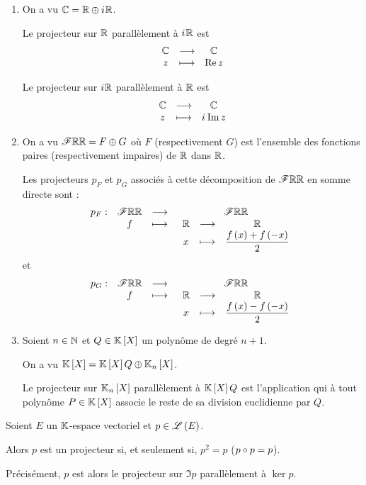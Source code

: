 \begin{ex}
\begin{enumerate}
\item On a vu \(\C=\R\oplus\i\R\).

Le projecteur sur \(\R\) parallèlement à \(\i\R\) est \[\fonctionlambda{\C}{\C}{z}{\Re z}\]

Le projecteur sur \(\i\R\) parallèlement à \(\R\) est \[\fonctionlambda{\C}{\C}{z}{\i\Im z}\]

\item On a vu \(\F{\R}{\R}=F\oplus G\) où \(F\) (respectivement \(G\)) est l'ensemble des fonctions paires (respectivement impaires) de \(\R\) dans \(\R\).

Les projecteurs \(p_F\) et \(p_G\) associés à cette décomposition de \(\F{\R}{\R}\) en somme directe sont : \[\fonction{p_F}{\F{\R}{\R}}{\F{\R}{\R}}{f}{\fonctionlambda{\R}{\R}{x}{\dfrac{f\paren{x}+f\paren{-x}}{2}}}\] et \[\fonction{p_G}{\F{\R}{\R}}{\F{\R}{\R}}{f}{\fonctionlambda{\R}{\R}{x}{\dfrac{f\paren{x}-f\paren{-x}}{2}}}\]

\item Soient \(n\in\N\) et \(Q\in\poly\) un polynôme de degré \(n+1\).

On a vu \(\poly=\poly Q\oplus\polydeg{n}\).

Le projecteur sur \(\polydeg{n}\) parallèlement à \(\poly Q\) est l'application qui à tout polynôme \(P\in\poly\) associe le reste de sa division euclidienne par \(Q\).
\end{enumerate}
\end{ex}

\begin{prop}
Soient \(E\) un \(\K\)-espace vectoriel et \(p\in\Lendo{E}\).

Alors \(p\) est un projecteur si, et seulement si, \(p^2=p\) (\cad \(p\rond p=p\)).

Précisément, \(p\) est alors le projecteur sur \(\Im p\) parallèlement à \(\ker p\).
\end{prop}

